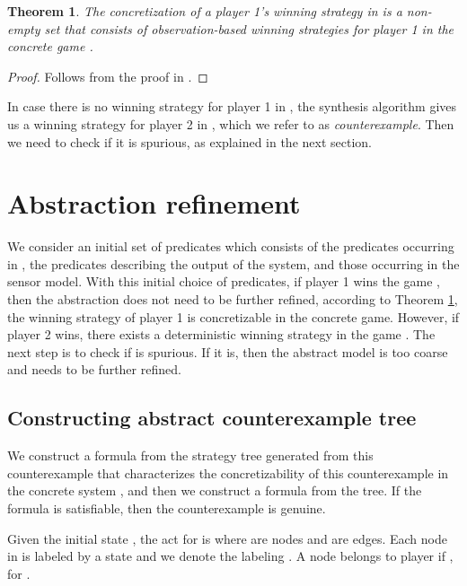 \documentclass[letterpaper, 10 pt, conference]{ieeeconf}
\newtheorem{theorem}{Theorem}
\begin{document}
\begin{theorem}\label{thm:soundness}
The concretization  of a player 1's winning strategy
 in  is a non-empty set that consists of observation-based winning
strategies for player 1 in the concrete game .
\end{theorem}
\begin{proof}
Follows from the proof in \cite{rayna-report}.
\end{proof}

In case there is no winning strategy for player 1 in ,
the synthesis algorithm gives us a winning strategy for player 2 in ,
which we refer to as \emph{counterexample}. Then we need to check if
it is spurious, as explained in the next
section.


\section{Abstraction refinement}
We consider an initial set of predicates  which consists
of the predicates occurring in , the predicates
describing the output  of the system, and those
occurring in the sensor model.  With this initial choice of predicates,
if player 1 wins the game , then the abstraction does not need
to be further refined,  according to Theorem \ref{thm:soundness},
the winning strategy of player 1 is concretizable in the concrete
game.  However, if player 2 wins, there exists a deterministic winning strategy  in the game
. The next step is to check if  is
spurious. If it is, then the abstract model is too coarse and needs to
be further refined.

\subsection{Constructing abstract counterexample tree}
We construct a formula from the strategy tree generated from this
counterexample that characterizes the concretizability of this counterexample in the
concrete system , and then we construct a formula from the
 tree. If the formula is satisfiable, then the counterexample is genuine.

 Given the initial state , the \ac{act} for  is
  where
  are nodes and  are edges.  Each node  in  is labeled by
 a state  and we denote the labeling .  A node
  belongs to player  if , for .
\end{document}
